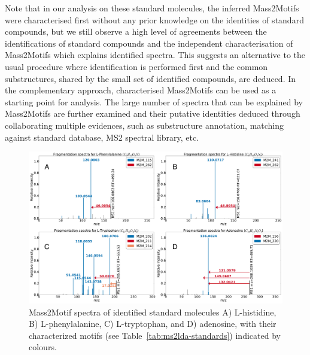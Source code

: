 Note that in our analysis on these standard molecules, the inferred Mass2Motifs were characterised first without any prior knowledge on the identities of standard compounds, but we still observe a high level of agreements between the identifications of standard compounds and the independent characterisation of Mass2Motifs which explains identified spectra. This suggests an alternative to the usual procedure where identification is performed first and the common substructures, shared by the small set of identified compounds, are deduced. In the complementary approach, characterised Mass2Motifs can be used as a starting point for analysis. The large number of spectra that can be explained by Mass2Motifs are further examined and their putative identities deduced through collaborating multiple evidences, such as substructure annotation, matching against standard database, MS2 spectral library, etc. 

\begin{figure}[!htbp]
\centering\includegraphics[width=0.8\linewidth]{07-lda/figures/standards.pdf}
\centering\caption{Mass2Motif spectra of identified standard molecules A) L-histidine, B) L-phenylalanine, C) L-tryptophan, and D) adenosine, with their characterized motifs (see Table~\ref{tab:ms2lda-standards}) indicated by colours.\label{fig:m2lda-standards}}
\end{figure}


